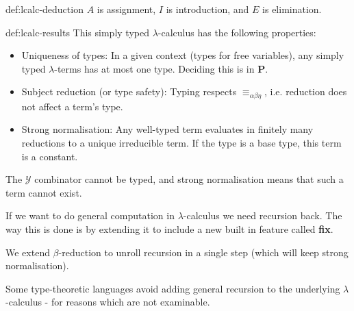 \documentclass[landscape, 8pt]{extarticle}
\begin{document}
\begin{multicols}{3}
\begin{dfn}{def:lcalc-deduction}{}
$A$ is assignment, $I$ is introduction, and $E$ is elimination.
\end{dfn}

\begin{dfn}{def:lcalc-results}{}
This simply typed $\lambda$-calculus has the following properties:
\begin{itemize}
    \item Uniqueness of types: In a given context (types for free variables), any simply typed $\lambda$-terms has at most one type. Deciding this is in \textbf{P}.
    \item Subject reduction (or type safety): Typing respects $\equiv_{\alpha\beta\eta}$, i.e. reduction does not affect a term's type.
    \item Strong normalisation: Any well-typed term evaluates in finitely many reductions to a unique irreducible term. If the type is a base type, this term is a constant.
\end{itemize}

The $\mathcal{Y}$ combinator cannot be typed, and strong normalisation means that such a term cannot exist.

If we want to do general computation in $\lambda$-calculus we need recursion back. The way this is done is by extending it to include a new built in feature called \textbf{fix}.

We extend $\beta$-reduction to unroll recursion in a single step (which will keep strong normalisation). 

Some type-theoretic languages avoid adding general recursion to the underlying $\lambda$-calculus - for reasons which are not examinable.
\end{dfn}










\end{multicols}
\end{document}
